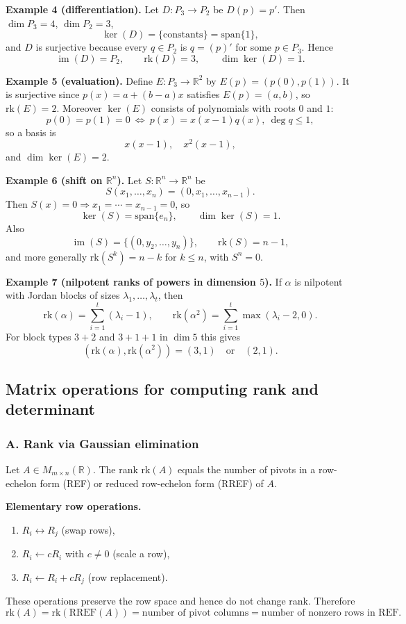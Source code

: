 \documentclass[12pt,a4paper]{article}
\theoremstyle{plain}
\theoremstyle{definition}      %
\begin{document}
\bigskip
\textbf{Example 4 (differentiation).}
Let $D:P_3\to P_2$ be $D(p)=p'$. Then $\dim P_3=4$, $\dim P_2=3$,
\[
\ker(D)=\{\text{constants}\}=\mathrm{span}\{1\},
\]
and $D$ is surjective because every $q\in P_2$ is $q=(p)'$ for some $p\in P_3$.
Hence
\[
\operatorname{im}(D)=P_2,\qquad \mathrm{rk}(D)=3,\qquad \dim\ker(D)=1.
\]

\bigskip
\textbf{Example 5 (evaluation).}
Define $E:P_3\to\mathbb R^2$ by $E(p)=(p(0),p(1))$.
It is surjective since $p(x)=a+(b-a)x$ satisfies $E(p)=(a,b)$, so $\mathrm{rk}(E)=2$.
Moreover $\ker(E)$ consists of polynomials with roots $0$ and $1$:
\[
p(0)=p(1)=0\ \Longleftrightarrow\ p(x)=x(x-1)q(x),\ \deg q\le 1,
\]
so a basis is
\[
x(x-1),\quad x^2(x-1),
\]
and $\dim\ker(E)=2$.

\bigskip
\textbf{Example 6 (shift on $\mathbb R^n$).}
Let $S:\mathbb R^n\to\mathbb R^n$ be
\[
S(x_1,\dots,x_n)=(0,x_1,\dots,x_{n-1}).
\]
Then $S(x)=0\Rightarrow x_1=\cdots=x_{n-1}=0$, so
\[
\ker(S)=\mathrm{span}\{e_n\},\qquad \dim\ker(S)=1.
\]
Also
\[
\operatorname{im}(S)=\{(0,y_2,\dots,y_n)\},
\qquad \mathrm{rk}(S)=n-1,
\]
and more generally $\mathrm{rk}(S^k)=n-k$ for $k\le n$, with $S^n=0$.

\bigskip
\textbf{Example 7 (nilpotent ranks of powers in dimension $5$).}
If $\alpha$ is nilpotent with Jordan blocks of sizes $\lambda_1,\dots,\lambda_t$, then
\[
\mathrm{rk}(\alpha)=\sum_{i=1}^t(\lambda_i-1),\qquad
\mathrm{rk}(\alpha^2)=\sum_{i=1}^t\max(\lambda_i-2,0).
\]
For block types $3+2$ and $3+1+1$ in $\dim 5$ this gives
\[
( \mathrm{rk}(\alpha),\mathrm{rk}(\alpha^2))=(3,1)\quad\text{or}\quad(2,1).
\]

\subsection*{Matrix operations for computing rank and determinant}

\subsubsection*{A. Rank via Gaussian elimination}

Let $A\in M_{m\times n}(\mathbb R)$. The rank $\mathrm{rk}(A)$ equals the number of pivots in a row-echelon form
(REF) or reduced row-echelon form (RREF) of $A$.

\medskip
\noindent\textbf{Elementary row operations.}
\begin{enumerate}
	\item $R_i\leftrightarrow R_j$ (swap rows),
	\item $R_i\leftarrow cR_i$ with $c\neq 0$ (scale a row),
	\item $R_i\leftarrow R_i+cR_j$ (row replacement).
\end{enumerate}
These operations preserve the row space and hence do not change rank. Therefore
\[
\mathrm{rk}(A)=\mathrm{rk}(\mathrm{RREF}(A))
=\text{number of pivot columns}
=\text{number of nonzero rows in REF}.
\]
\end{document}
